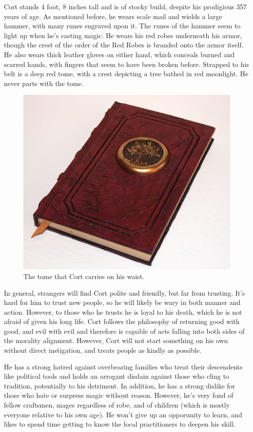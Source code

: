 \documentclass[12pt]{article}
\begin{document}
Cort stands 4 foot, 8 inches tall and is of stocky build, despite his prodigious
357 years of age. As mentioned before, he wears scale mail and wields a large
hammer, with many runes engraved upon it. The runes of the hammer seem to light
up when he's casting magic. He wears his red robes underneath his armor, though
the crest of the order of the Red Robes is branded onto the armor itself. He
also wears thick leather gloves on either hand, which conceals burned and
scarred hands, with fingers that seem to have been broken before. Strapped to
his belt is a deep red tome, with a crest depicting a tree bathed in red
moonlight. He never parts with the tome.

\begin{figure}[H]
    \centering
    \includegraphics[width=.65\textwidth]{./resources/tome.jpg}
    \caption{The tome that Cort carries on his waist.} \label{fig:tome}
\end{figure}

In general, strangers will find Cort polite and friendly, but far from trusting.
It's hard for him to trust new people, so he will likely be wary in both manner
and action. However, to those who he trusts he is loyal to his death, which he
is not afraid of given his long life. Cort follows the philosophy of returning
good with good, and evil with evil and therefore is capable of acts falling into
both sides of the morality alignment. However, Cort will not start something on
his own without direct instigation, and treats people as kindly as possible. 

He has a strong hatred against overbearing families who treat their descendents
like political tools and holds an arrogant disdain against those who cling to
tradition, potentially to his detriment. In addition, he has a strong dislike
for those who hate or surpress magic without reason. However, he's very fond of
fellow craftsmen, mages regardless of robe, and of children (which is mostly
everyone relative to his own age). He won't give up an opporunity to learn, and
likes to spend time getting to know the local practitioners to deepen his skill.
\end{document}
